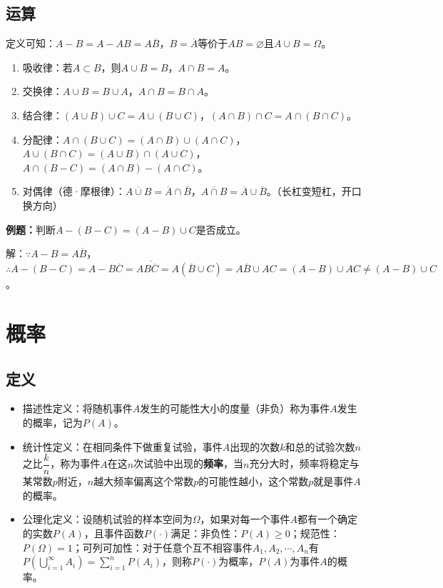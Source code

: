 \subsection{运算}

定义可知：$A-B=A-AB=A\overline{B}$，$B=\overline{A}$等价于$AB=\varnothing$且$A\cup B=\Omega$。

\begin{enumerate}
    \item 吸收律：若$A\subset B$，则$A\cup B=B$，$A\cap B=A$。
    \item 交换律：$A\cup B=B\cup A$，$A\cap B=B\cap A$。
    \item 结合律：$(A\cup B)\cup C=A\cup(B\cup C)$，$(A\cap B)\cap C=A\cap(B\cap C)$。
    \item 分配律：$A\cap(B\cup C)=(A\cap B)\cup(A\cap C)$，$A\cup(B\cap C)=(A\cup B)\cap(A\cup C)$，$A\cap(B-C)=(A\cap B)-(A\cap C)$。
    \item 对偶律（德·摩根律）：$\overline{A\cup B}=\overline{A}\cap\overline{B}$，$\overline{A\cap B}=\overline{A}\cup\overline{B}$。（长杠变短杠，开口换方向）
\end{enumerate}

\textbf{例题：}判断$A-(B-C)=(A-B)\cup C$是否成立。

解：$\because A-B=A\overline{B}$，$\therefore A-(B-C)=A-B\overline{C}=A\overline{B\overline{C}}=A(\overline{B}\cup C)=A\overline{B}\cup AC=(A-B)\cup AC\neq (A-B)\cup C$。

\section{概率}

\subsection{定义}

\begin{itemize}
    \item 描述性定义：将随机事件$A$发生的可能性大小的度量（非负）称为事件$A$发生的概率，记为$P(A)$。
    \item 统计性定义：在相同条件下做重复试验，事件$A$出现的次数$k$和总的试验次数$n$之比$\dfrac{k}{n}$，称为事件$A$在这$n$次试验中出现的\textbf{频率}，当$n$充分大时，频率将稳定与某常数$p$附近，$n$越大频率偏离这个常数$p$的可能性越小，这个常数$p$就是事件$A$的概率。
    \item 公理化定义：设随机试验的样本空间为$\Omega$，如果对每一个事件$A$都有一个确定的实数$P(A)$，且事件函数$P(\cdot)$满足：非负性：$P(A)\geqslant0$；规范性：$P(\Omega)=1$；可列可加性：对于任意个互不相容事件$A_1,A_2,\cdots,A_n$有$P(\bigcup\limits_{i=1}^\infty A_i)=\sum\limits_{i=1}^nP(A_i)$，则称$P(\cdot)$为概率，$P(A)$为事件$A$的概率。
\end{itemize}

